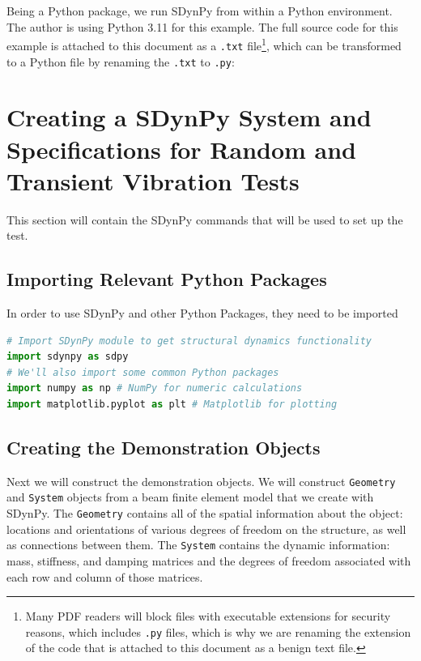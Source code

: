\documentclass[pdf,12pt,report]{SANDreport}
\newcommand{\inlineCode}{\lstinline[basicstyle=\bfseries\ttfamily]}
\begin{document}
{{{{    Being a Python package, we run SDynPy from within a Python environment.  The author is using Python 3.11 for this example.  The full source code for this example is attached to this document as a \inlineCode{.txt} file\footnote{Many PDF readers will block files with executable extensions for security reasons, which includes \inlineCode{.py} files, which is why we are renaming the extension of the code that is attached to this document as a benign text file.}, which can be transformed to a Python file by renaming the \inlineCode{.txt} to \inlineCode{.py}: 
    
    \section{Creating a SDynPy System and Specifications for Random and Transient Vibration Tests}
    
    This section will contain the SDynPy commands that will be used to set up the test.
    
    \subsection{Importing Relevant Python Packages}
    
    In order to use SDynPy and other Python Packages, they need to be imported 
    
    \begin{lstlisting}[language=Python]
# Import SDynPy module to get structural dynamics functionality
import sdynpy as sdpy
# We'll also import some common Python packages
import numpy as np # NumPy for numeric calculations
import matplotlib.pyplot as plt # Matplotlib for plotting\end{lstlisting}
    
    \subsection{Creating the Demonstration Objects}
    
    Next we will construct the demonstration objects.  We will construct \inlineCode{Geometry} and \inlineCode{System} objects from a beam finite element model that we create with SDynPy.  The \inlineCode{Geometry} contains all of the spatial information about the object: locations and orientations of various degrees of freedom on the structure, as well as connections between them.  The \inlineCode{System} contains the dynamic information: mass, stiffness, and damping matrices and the degrees of freedom associated with each row and column of those matrices.
    
}}}}
\end{document}
